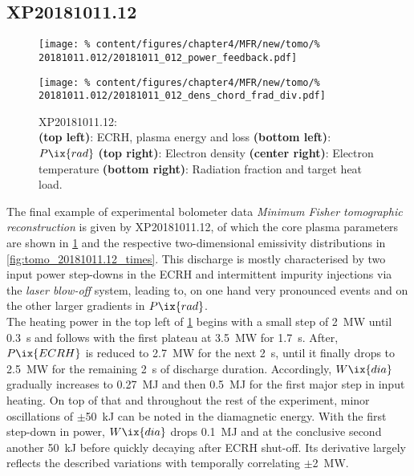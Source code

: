             \subsection*{XP20181011.12}%
%
            \begin{figure}[t]%
                \centering%
                \captionsetup{width=0.49\textwidth}%
                \begin{minipage}[c]{0.49\textwidth}%
                    \centering%
                    \texttt{[image: \%
                        content/figures/chapter4/MFR/new/tomo/\%
                        20181011.012/20181011\_012\_power\_feedback.pdf]}%
                    \caption{%
                        XP20181011.12:\\%
                        \textbf{(top left)}: ECRH, plasma energy and loss \textbf{(bottom left)}: $P\ix{rad}$ \textbf{(top right)}: Electron density \textbf{(center right)}: Electron temperature \textbf{(bottom right)}: Radiation fraction and target heat load.}\label{fig:20181011.12_PDF}%
                \end{minipage}%
                \hfill%
                \begin{minipage}[c]{0.49\textwidth}%
                    \centering%
                    \texttt{[image: \%
                        content/figures/chapter4/MFR/new/tomo/\%
                        20181011.012/20181011\_012\_dens\_chord\_frad\_div.pdf]}%
                \end{minipage}%
            \end{figure}%
%
            The final example of experimental bolometer data \textit{Minimum Fisher tomographic reconstruction} is given by XP20181011.12, of which the core plasma parameters are shown in \cref{fig:20181011.12_PDF} and the respective two-dimensional emissivity distributions in \cref{fig:tomo_20181011.12_times}. This discharge is mostly characterised by two input power step-downs in the ECRH and intermittent impurity injections via the \textit{laser blow-off} system, leading to, on one hand very pronounced events and on the other larger gradients in $P\ix{rad}$.\\%
            The heating power in the top left of \cref{fig:20181011.12_PDF} begins with a small step of \SI{2}{\mega\watt} until \SI{0.3}{\second} and follows with the first plateau at \SI{3.5}{\mega\watt} for \SI{1.7}{\second}. After, $P\ix{ECRH}$ is reduced to \SI{2.7}{\mega\watt} for the next \SI{2}{\second}, until it finally drops to \SI{2.5}{\mega\watt} for the remaining \SI{2}{\second} of discharge duration. Accordingly, $W\ix{dia}$ gradually increases to \SI{0.27}{\mega\joule} and then \SI{0.5}{\mega\joule} for the first major step in input heating. On top of that and throughout the rest of the experiment, minor oscillations of $\pm$\SI{50}{\kilo\joule} can be noted in the diamagnetic energy. With the first step-down in power, $W\ix{dia}$ drops \SI{0.1}{\mega\joule} and at the conclusive second another \SI{50}{\kilo\joule} before quickly decaying after ECRH shut-off. Its derivative largely reflects the described variations with temporally correlating $\pm$\SI{2}{\mega\watt}.\\%
